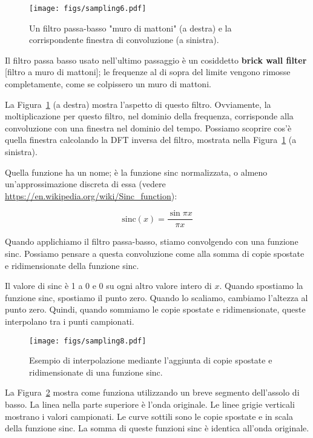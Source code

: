 \documentclass[12pt]{book} \usepackage[width=5.5in,height=8.5in, hmarginratio=3:2,vmarginratio=1:1]{geometry}
\begin{document}
\begin{figure} 

\centerline{\texttt{[image: figs/sampling6.pdf]}} \caption{Un filtro passa-basso "muro di mattoni" (a destra) e la corrispondente finestra di convoluzione (a sinistra).} \label{fig.sampling6} \end{figure} 

Il filtro passa basso usato nell'ultimo passaggio è un cosiddetto {\bf brick wall filter} [filtro a muro di mattoni]; le frequenze al di sopra del limite vengono rimosse completamente, come se colpissero un muro di mattoni.

La Figura~\ref{fig.sampling6} (a destra) mostra l'aspetto di questo filtro. Ovviamente, la moltiplicazione per questo filtro, nel dominio della frequenza, corrisponde alla convoluzione con una finestra nel dominio del tempo. Possiamo scoprire cos'è quella finestra calcolando la DFT inversa del filtro, mostrata nella Figura~\ref{fig.sampling6} (a sinistra).

Quella funzione ha un nome; è la funzione sinc normalizzata, o almeno un'approssimazione discreta di essa (vedere \url{https://en.wikipedia.org/wiki/Sinc_function}):

\[ \mathrm{sinc}(x) = \frac{\sin \pi x}{\pi x} \] 

Quando applichiamo il filtro passa-basso, stiamo convolgendo con una funzione sinc. Possiamo pensare a questa convoluzione come alla somma di copie spostate e ridimensionate della funzione sinc.

Il valore di sinc è 1 a 0 e 0 su ogni altro valore intero di $x$. Quando spostiamo la funzione sinc, spostiamo il punto zero. Quando lo scaliamo, cambiamo l'altezza al punto zero. Quindi, quando sommiamo le copie spostate e ridimensionate, queste interpolano tra i punti campionati.

\begin{figure} 

\centerline{\texttt{[image: figs/sampling8.pdf]}} \caption{Esempio di interpolazione mediante l'aggiunta di copie spostate e ridimensionate di una funzione sinc.} \label{fig.sampling8} \end{figure} 

La Figura~\ref{fig.sampling8} mostra come funziona utilizzando un breve segmento dell'assolo di basso. La linea nella parte superiore è l'onda originale. Le linee grigie verticali mostrano i valori campionati. Le curve sottili sono le copie spostate e in scala della funzione sinc. La somma di queste funzioni sinc è identica all'onda originale.
\end{document}
